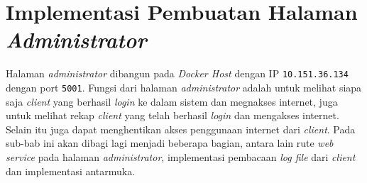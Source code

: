 \section{Implementasi Pembuatan Halaman \textit{Administrator}}
Halaman \textit{administrator} dibangun pada \textit{Docker Host} dengan IP \texttt{10.151.36.134} dengan port \texttt{5001}. Fungsi dari halaman \textit{administrator} adalah untuk melihat siapa saja \textit{client} yang berhasil \textit{login} ke dalam sistem dan megnakses internet, juga untuk melihat rekap \textit{client} yang telah berhasil \textit{login} dan mengakses internet. Selain itu juga dapat menghentikan akses penggunaan internet dari \textit{client}. Pada sub-bab ini akan dibagi lagi menjadi beberapa bagian, antara lain rute \textit{web service} pada halaman \textit{administrator}, implementasi pembacaan \textit{log file} dari \textit{client} dan implementasi antarmuka.

